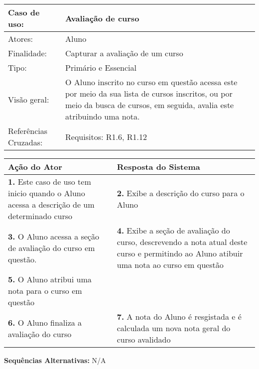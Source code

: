 \documentclass[12pt,a4paper,onecolumn,titlepage]{article}
\begin{document}
\begin{table}[h!]
\begin{center}
\begin{tabular}{p{2.5cm} p{9.5cm}}
Caso de uso: & \textbf{Avaliação de curso} \\ \hline
Atores: & Aluno \\ \hline
Finalidade: & Capturar a avaliação de um curso\\ \hline
Tipo: & Primário e Essencial \\ \hline
Visão geral: & O Aluno inscrito no curso em questão acessa este por meio da sua lista de cursos inscritos, ou por meio da busca de cursos, em seguida, avalia este atribuindo uma nota. \\ \hline
Referências Cruzadas: & Requisitos: R1.6, R1.12\\

\end{tabular}
\end{center}
\end{table} 

\begin{center}
\def\arraystretch{1.1}
\begin{tabular}{|p{6cm}|p{6cm}|}

\hline
\textbf{Ação do Ator} & \textbf{Resposta do Sistema} \\ \hline
\textbf{1.} Este caso de uso tem inicio quando o Aluno acessa a descrição de um determinado curso  & \textbf{2.} Exibe a descrição do curso para o Aluno  \\ \hline
\textbf{3.} O Aluno acessa a seção de avaliação do curso em questão.  & \textbf{4.} Exibe a seção de avaliação do curso, descrevendo a nota atual deste curso e permitindo ao Aluno atibuir uma nota ao curso em questão  \\ \hline
\textbf{5.} O Aluno atribui uma nota para o curso em questão  &   \\ \hline
\textbf{6.} O Aluno finaliza a avaliação do curso  & \textbf{7.} A nota do Aluno é resgistada e é calculada um nova nota geral do curso avalidado \\ \hline
\end{tabular}
\end{center}

\textbf{Sequências Alternativas:} N/A


\newpage
\end{document}
